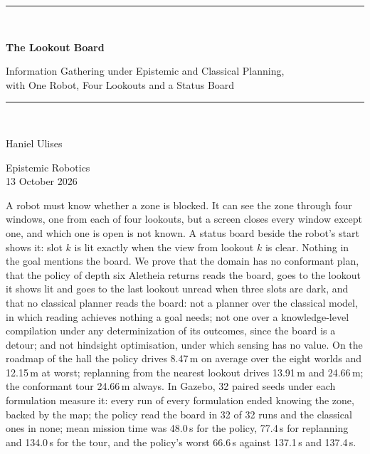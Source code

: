 \documentclass[11pt,a4paper]{article}
\theoremstyle{definition}
\begin{document}
\begin{titlepage}
\centering
\vspace*{2.4cm}
{\color{rulegrey}\rule{\textwidth}{0.8pt}}\\[0.9cm]
{\LARGE\bfseries The Lookout Board\par}
\vspace{0.5cm}
{\large\color{slate} Information Gathering under Epistemic and Classical Planning,\\
with One Robot, Four Lookouts and a Status Board\par}
\vspace{0.7cm}
{\color{rulegrey}\rule{\textwidth}{0.8pt}}\\[1.4cm]

{\large Haniel Ulises\par}
\vspace{0.3cm}
{\color{slate} Epistemic Robotics}\\
\vspace{0.15cm}
{\color{slate}13 October 2026}

\vfill
{\color{slate}\small
A robot must know whether a zone is blocked. It can see the zone through four
windows, one from each of four lookouts, but a screen closes every window
except one, and which one is open is not known. A status board beside the
robot's start shows it: slot $k$ is lit exactly when the view from lookout $k$
is clear. Nothing in the goal mentions the board. We prove that the domain has
no conformant plan, that the policy of depth six Aletheia returns reads the
board, goes to the lookout it shows lit and goes to the last lookout unread
when three slots are dark, and that no classical planner reads the board: not
a planner over the classical model, in which reading achieves nothing a goal
needs; not one over a knowledge-level compilation under any determinization of
its outcomes, since the board is a detour; and not hindsight optimisation,
under which sensing has no value. On the roadmap of the hall the policy drives
8.47\,m on average over the eight worlds and 12.15\,m at worst; replanning from
the nearest lookout drives 13.91\,m and 24.66\,m; the conformant tour 24.66\,m
always. In Gazebo, 32 paired seeds under each formulation measure it:
every run of every formulation ended knowing the zone, backed by the map; the
policy read the board in 32 of 32 runs and the classical ones in
none; mean mission time was 48.0\,s for the policy, 77.4\,s for
replanning and 134.0\,s for the tour, and the policy's worst
66.6\,s against 137.1\,s and 137.4\,s.}
\vspace{1.2cm}
\end{titlepage}
\end{document}
